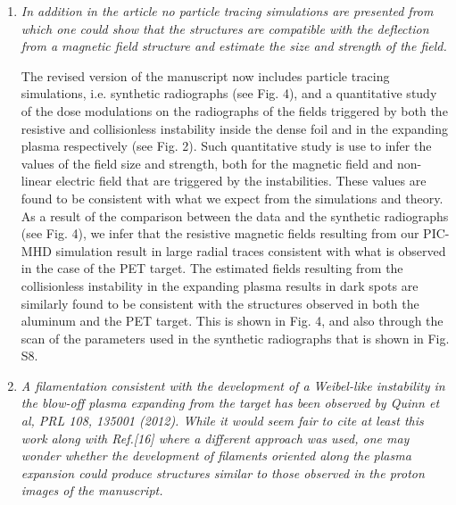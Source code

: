 \documentclass{article}
\begin{document}
\begin{enumerate}
\item \textit{In addition in the article no particle tracing simulations are presented from which one could show that the structures are compatible with the deflection from a magnetic field structure and estimate the size and strength of the field. }

The revised version of the manuscript now includes particle tracing simulations, i.e. synthetic radiographs (see Fig. 4), and a quantitative study of the dose modulations on the radiographs of the  fields triggered by both  the resistive and collisionless instability inside the dense foil and in the expanding plasma respectively (see Fig. 2). Such quantitative study is use to infer the values of the field size and strength, both for the magnetic field and non-linear electric field  that are triggered by the instabilities.  These values are found to be consistent with what we expect from the simulations and theory.
As a result of the comparison between the data and the synthetic radiographs (see Fig. 4), we infer that the resistive magnetic fields resulting from our PIC-MHD simulation result in large radial traces consistent with what is observed in the case of the PET target. The estimated fields resulting from the collisionless instability in the expanding plasma results in dark spots are similarly found to be consistent with the structures observed in both the aluminum and the PET target. This is shown in Fig. 4, and also through the scan of the parameters used in the synthetic radiographs that is shown in Fig. S8.

\item \textit{A filamentation consistent with the development of a Weibel-like instability in the blow-off plasma expanding from the target has been observed by Quinn et al, PRL 108, 135001 (2012). While it would seem fair to cite at least this work along with Ref.[16] where a different approach was used, one may wonder whether the development of filaments oriented along the plasma expansion could produce structures similar to those observed in the proton images of the manuscript. }


\end{enumerate}
\end{document}
